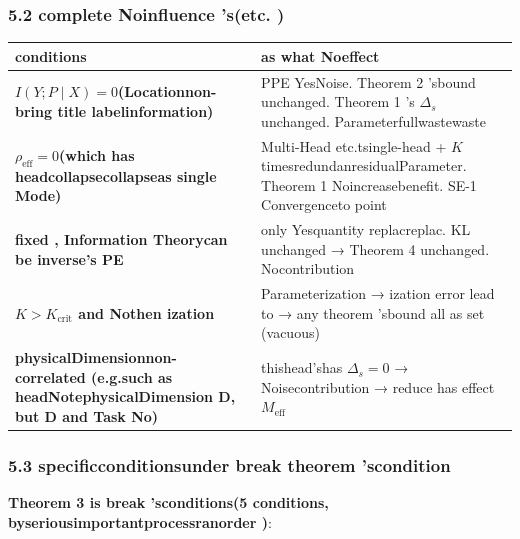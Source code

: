 \documentclass[
  12pt,
]{article}
\begin{document}
\subsubsection{5.2
complete Noinfluence 's(etc. )}\label{ux5b8cux5168ux65e0ux5f71ux54cdux7684ux5730ux65b9ux52a0ux4e86ux7b49ux4e8eux767dux52a0}

\begin{longtable}[]{@{}
  >{\raggedright\arraybackslash}p{}
  >{\raggedright\arraybackslash}p{}@{}}
\toprule\noalign{}
\begin{minipage}[b]{\linewidth}\raggedright
conditions
\end{minipage} & \begin{minipage}[b]{\linewidth}\raggedright
as what Noeffect
\end{minipage} \\
\midrule\noalign{}
\endhead
\bottomrule\noalign{}
\endlastfoot
\textbf{\(I(Y; P \mid X) = 0\)(Locationnon-bring title labelinformation)} & PPE
YesNoise. Theorem 2 'sbound unchanged. Theorem 1 's \(\Delta_s\)
unchanged. Parameterfullwastewaste \\
\textbf{\(\rho_{\text{eff}} = 0\)(which has headcollapsecollapseas single Mode)} & Multi-Head
etc.tsingle-head + \(K\) timesredundanresidualParameter. Theorem 1 Noincreasebenefit. SE-1 Convergenceto point  \\
\textbf{fixed , Information Theorycan be inverse's PE} & only Yesquantity replacreplac. KL unchanged → Theorem 4
unchanged. Nocontribution  \\
\textbf{\(K > K_{\text{crit}}\) and Nothen ization } & Parameterization  → ization error lead to
→ any theorem 'sbound all as set (vacuous) \\
\textbf{physicalDimensionnon-correlated (e.g.such as headNotephysicalDimension D, but  D and Task No)} &
thishead'shas  \(\Delta_s = 0\) → Noisecontribution  → reduce has effect
\(M_{\text{eff}}\) \\
\end{longtable}

\subsubsection{5.3
specificconditionsunder break theorem 'scondition}\label{ux7279ux5b9aux6761ux4ef6ux4e0bux7834ux574fux5b9aux7406ux7684ux60c5ux51b5}

\textbf{Theorem 3 is break 'sconditions(5 conditions, byseriousimportantprocessranorder )}: 
\end{document}
